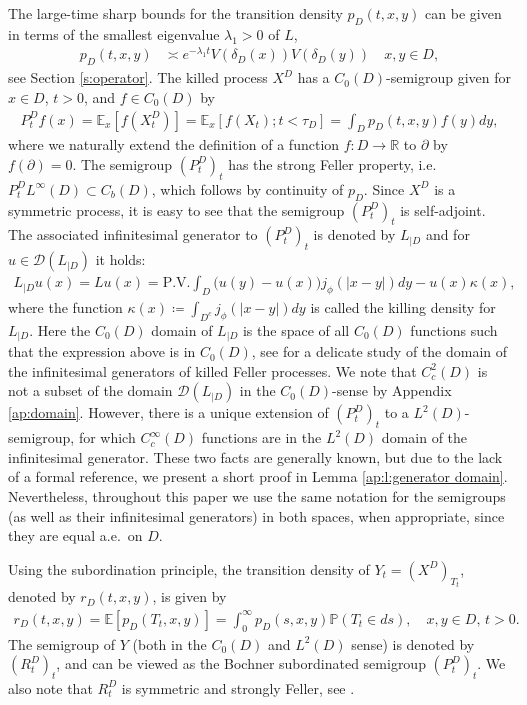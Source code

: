 \documentclass[12pt,a4paper,onecolumn]{article}
\theoremstyle{definition}
\newcommand{\R}{\mathbb{R}}
\newcommand{\p}{\mathds{P}}
\newcommand{\ex}{\mathds{E}}
\newcommand{\1}{\mathbf 1}
\newcommand{\de}{\delta_D}
\newcommand{\DD}{\mathcal{D}}
\newcommand{\Lbase}{L_{|D}}
\numberwithin{equation}{section}
\begin{document}
    The large-time sharp bounds for the transition density $p_D(t,x,y)$ can be given in terms of the smallest eigenvalue $\lambda_1>0$ of $L$,
	\begin{align}\label{eq:heat-sharp-big}
		p_D(t,x,y)&\asymp e^{-\lambda_1 t}V(\de(x))V(\de(y))\quad x,y\in D,
	\end{align}
see Section	\ref{s:operator}. The killed process $X^D$ has a $C_0(D)$-semigroup given for $x\in D$, $t>0$, and $f\in C_0(D)$ by
    \begin{align*}
        P^D_tf(x)=\ex_{x}[f(X^D_t)]=\ex_{x}[f(X_t);t<\tau_D]=\int_D p_D(t,x,y)f(y)dy, 
    \end{align*}
    where we naturally extend the definition of a function $f:D\to\R$ to $\partial$ by $f(\partial)=0$. The semigroup $(P_t^D)_t$ has the strong Feller property, i.e. $P_t^D L^\infty(D)\subset C_b (D)$, which follows by continuity of $p_D$. Since $X^D$ is a symmetric process, it is easy to see that the semigroup $(P^D_t)_t$ is self-adjoint. The associated infinitesimal generator to $(P^D_t)_t$ is denoted by $\Lbase$ and for $u\in \DD(\Lbase)$ it holds:
    \begin{align}\label{eq:Lbase-defD}
        \Lbase u(x)=Lu(x)=\textrm{P.V.}\int_D\big(u(y)-u(x)\big)j_\phi(|x-y|)dy-u(x)\kappa(x),
    \end{align}
    where the function $\kappa(x)\coloneqq\int_{D^c}j_\phi(|x-y|)dy$ is called the killing density for $\Lbase$. Here the $C_0(D)$ domain of $\Lbase$ is the space of all $C_0(D)$ functions such that the expression above is in $C_0(D)$, see \cite{BaeumerLuksMeersc-SpaceTime18} for a delicate study of the domain of the infinitesimal generators of killed Feller processes. We note that $C_c^2(D)$ is not a subset of the domain $\DD(\Lbase)$ in the $C_0(D)$-sense by Appendix \ref{ap:domain}. However, there is a unique extension of $(P^D_t)_t$ to a $L^2(D)$-semigroup, for which $C_c^\infty(D)$ functions are in the $L^2(D)$ domain of the infinitesimal generator. These two facts are generally known, but due to the lack of a formal reference, we present a short proof in Lemma \ref{ap:l:generator domain}. Nevertheless, throughout this paper we use the same notation for the semigroups (as well as their infinitesimal generators) in both spaces, when appropriate, since they are equal a.e.~on $D$.


    Using the subordination principle, the transition density of $Y_t=(X^D)_{T_t}$, denoted by $r_D(t,x,y)$, is given by
        \begin{align*}
            r_D(t,x,y)=\ex[p_D(T_t,x,y)]=\int_0^\infty p_D(s,x,y)\p(T_t\in ds),\quad x,y\in D, \, t>0.
        \end{align*}
    The semigroup of $Y$ (both in the $C_0(D)$ and $L^2(D)$ sense) is denoted by $(R^D_t)_t$, and can be viewed as the Bochner subordinated semigroup $(P^D_t)_t$. We also note that $R^D_t$ is symmetric and strongly Feller, see \cite[Proposition V.3.3]{bliedtner}.
    
\end{document}
